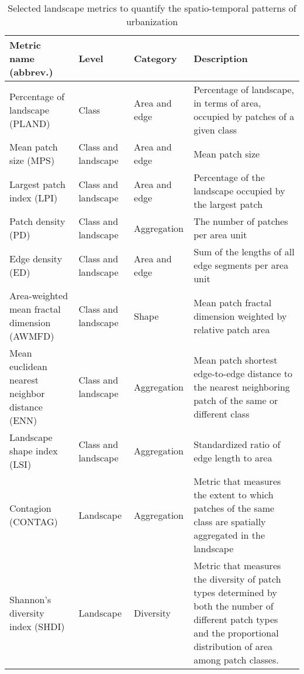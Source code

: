 \documentclass[10pt,letterpaper]{article}
\begin{document}
\begin{table}[!h]
  \begin{adjustwidth}{-.4\textwidth}{0cm} %
    \footnotesize %
    \renewcommand{\arraystretch}{1.3} %
    \centering
    \caption[Selected landscape metrics]{\label{selected-metrics}Selected landscape metrics to quantify the spatio-temporal patterns of urbanization}
    \begin{tabular}{p{} p{} p{} p{}} 
      \toprule
      \textbf{Metric name (abbrev.)} & \textbf{Level} & \textbf{Category} & \textbf{Description} \\
      \midrule
      Percentage of landscape (PLAND) & Class & Area and edge & Percentage of landscape, in terms of area, occupied by patches of a given class \\
      Mean patch size (MPS) & Class and landscape & Area and edge & Mean patch size \\
      Largest patch index (LPI) & Class and landscape & Area and edge & Percentage of the landscape occupied by the largest patch \\
      Patch density (PD) & Class and landscape & Aggregation & The number of patches per area unit \\
      Edge density (ED) & Class and landscape & Area and edge & Sum of the lengths of all edge segments per area unit \\
      Area-weighted mean fractal dimension (AWMFD) & Class and landscape & Shape & Mean patch fractal dimension weighted by relative patch area \\
      Mean euclidean nearest neighbor distance (ENN) & Class and landscape & Aggregation & Mean patch shortest edge-to-edge distance to the nearest neighboring patch of the same or different class \\
      Landscape shape index (LSI) & Class and landscape & Aggregation & Standardized ratio of edge length to area \\
      Contagion (CONTAG) & Landscape & Aggregation & Metric that measures the extent to which patches of the same class are spatially aggregated in the landscape \\
      Shannon's diversity index (SHDI) & Landscape & Diversity & Metric that measures the diversity of patch types determined by both the number of different patch types and the proportional distribution of area among patch classes. \\
      \bottomrule  
    \end{tabular}
  \end{adjustwidth}
\end{table}
\end{document}
